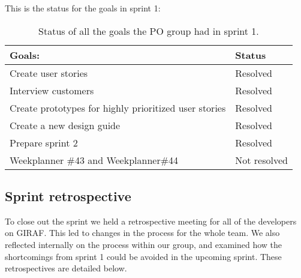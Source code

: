 \noindent
This is the status for the goals in sprint 1:
\begin{table}[H]
    \centering
    \begin{tabular}{|l|l|}
    \hline
    Goals:                                 & Status   \\ \hline
    Create user stories                    & Resolved \\ \hline
    Interview customers                    & Resolved \\ \hline
    Create prototypes for highly prioritized user stories & Resolved \\ \hline
    Create a new design guide                & Resolved \\ \hline
    Prepare sprint 2                       & Resolved \\ \hline
    Weekplanner \#43 and Weekplanner\#44                       & Not resolved \\ \hline
    \end{tabular}
    \caption{Status of all the goals the PO group had in sprint 1.}
    \label{PO-goal-review-sprint-1}
\end{table}

\subsection{Sprint retrospective}
To close out the sprint we held a retrospective meeting for all of the developers on GIRAF.
This led to changes in the process for the whole team.
We also reflected internally on the process within our group, and examined how the shortcomings from sprint 1 could be avoided in the upcoming sprint.
These retrospectives are detailed below.

